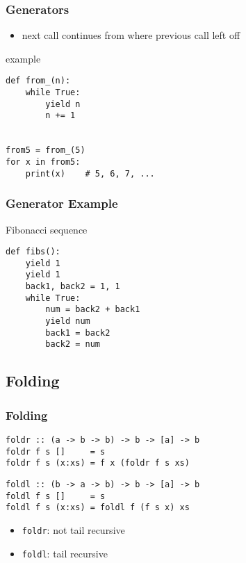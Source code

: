 \documentclass[dvipsnames]{beamer}
\theoremstyle{plain}
\begin{document}
\begin{frame}[fragile]
  \frametitle{Generators}

  \begin{itemize}
    \item next call continues from where previous call left off
  \end{itemize}

  \begin{exampleblock}{example}
    \begin{lstlisting}
def from_(n):
    while True:
        yield n
        n += 1


from5 = from_(5)
for x in from5:
    print(x)    # 5, 6, 7, ...
    \end{lstlisting}
  \end{exampleblock}
\end{frame}

\begin{frame}[fragile]
  \frametitle{Generator Example}

  \begin{exampleblock}{Fibonacci sequence}
    \begin{lstlisting}
def fibs():
    yield 1
    yield 1
    back1, back2 = 1, 1
    while True:
        num = back2 + back1
        yield num
        back1 = back2
        back2 = num
    \end{lstlisting}
  \end{exampleblock}
\end{frame}

\lstset{language=Haskell}

\subsection{Folding}

\begin{frame}[fragile]
  \frametitle{Folding}

  \begin{lstlisting}
foldr :: (a -> b -> b) -> b -> [a] -> b
foldr f s []     = s
foldr f s (x:xs) = f x (foldr f s xs)
  \end{lstlisting}

  \begin{lstlisting}
foldl :: (b -> a -> b) -> b -> [a] -> b
foldl f s []     = s
foldl f s (x:xs) = foldl f (f s x) xs
  \end{lstlisting}

  \medskip
  \begin{itemize}
    \item \lstinline|foldr|: not tail recursive
    \item \lstinline|foldl|: tail recursive
  \end{itemize}
\end{frame}
\end{document}
